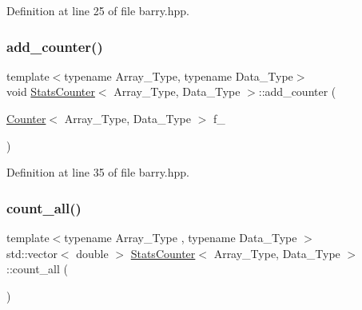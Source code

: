 Definition at line 25 of file barry.\+hpp.

\mbox{\label{classbarry_1_1_stats_counter_ad175dcd2bd30d017881783de546ac333}} 
\subsubsection{\texorpdfstring{add\+\_\+counter()}{add\_counter()}\hspace{0.1cm}{\footnotesize\ttfamily [2/2]}}
{\footnotesize\ttfamily template$<$typename Array\+\_\+\+Type, typename Data\+\_\+\+Type$>$ \\
void \hyperlink{classbarry_1_1_stats_counter}{Stats\+Counter}$<$ Array\+\_\+\+Type, Data\+\_\+\+Type $>$\+::add\+\_\+counter (\begin{DoxyParamCaption}\item[{\hyperlink{classbarry_1_1_counter}{Counter}$<$ Array\+\_\+\+Type, Data\+\_\+\+Type $>$}]{f\+\_\+ }\end{DoxyParamCaption})\hspace{0.3cm}{\ttfamily [inline]}}



Definition at line 35 of file barry.\+hpp.

\mbox{\label{classbarry_1_1_stats_counter_a83bd92031a1499109c98f238221cbd67}} 
\subsubsection{\texorpdfstring{count\+\_\+all()}{count\_all()}}
{\footnotesize\ttfamily template$<$typename Array\+\_\+\+Type , typename Data\+\_\+\+Type $>$ \\
std\+::vector$<$ double $>$ \hyperlink{classbarry_1_1_stats_counter}{Stats\+Counter}$<$ Array\+\_\+\+Type, Data\+\_\+\+Type $>$\+::count\+\_\+all (\begin{DoxyParamCaption}{ }\end{DoxyParamCaption})\hspace{0.3cm}{\ttfamily [inline]}}




